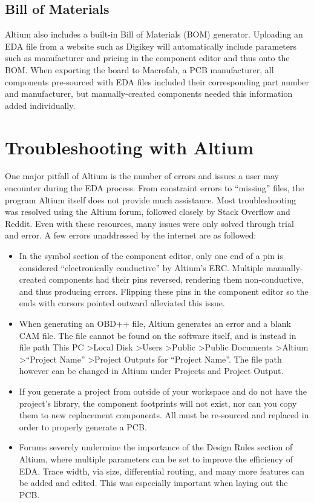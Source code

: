 \documentclass[twocolumn]{article}
\begin{document}
\subsection{Bill of Materials}
Altium also includes a built-in Bill of Materials (BOM) generator. Uploading an EDA file from a website such as Digikey will automatically include parameters such as manufacturer and pricing in the component editor and thus onto the BOM. When exporting the board to Macrofab\cite{Macrofab}, a PCB manufacturer, all components pre-sourced with EDA files included their corresponding part number and manufacturer, but manually-created components needed this information added individually.

\section{Troubleshooting with Altium}

One major pitfall of Altium is the number of errors and issues a user may encounter during the EDA process. From constraint errors to ``missing'' files, the program Altium itself does not provide much assistance. Most troubleshooting was resolved using the Altium forum\cite{Altium}, followed closely by Stack Overflow\cite{StackOverflow} and Reddit\cite{Reddit}. Even with these resources, many issues were only solved through trial and error. A few errors unaddressed by the internet are as followed:

\begin{itemize}
    \item In the symbol section of the component editor, only one end of a pin is considered ``electronically conductive'' by Altium's ERC. Multiple manually-created components had their pins reversed, rendering them non-conductive, and thus producing errors. Flipping these pins in the component editor so the ends with cursors pointed outward alleviated this issue.

    \item When generating an OBD++ file, Altium generates an error and a blank CAM file. The file cannot be found on the software itself, and is instead in file path This PC \textgreater Local Disk \textgreater Users \textgreater Public \textgreater Public Documents \textgreater Altium \textgreater ``Project Name'' \textgreater Project Outputs for ``Project Name''. The file path however can be changed in Altium under Projects and Project Output.

    \item If you generate a project from outside of your workspace and do not have the project's library, the component footprints will not exist, nor can you copy them to new replacement components. All must be re-sourced and replaced in order to properly generate a PCB.

    \item Forums severely undermine the importance of the Design Rules section of Altium, where multiple parameters can be set to improve the efficiency of EDA. Trace width, via size, differential routing, and many more features can be added and edited. This was especially important when laying out the PCB.

\end{itemize}
\end{document}
